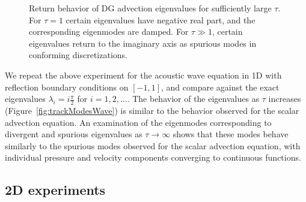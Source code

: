 \documentclass[10pt]{article}
\begin{document}
\begin{figure}
\hspace{.5em}
\hspace{.5em}
\caption{Return behavior of DG advection eigenvalues for sufficiently large $\tau$.  For $\tau = 1$ certain eigenvalues have negative real part, and the corresponding eigenmodes are damped.  For $\tau \gg 1$, certain eigenvalues return to the imaginary axis as spurious modes in conforming discretizations. }
\label{fig:spurious}
\end{figure}

We repeat the above experiment for the acoustic wave equation in 1D with reflection boundary conditions on $[-1,1]$, and compare against the exact eigenvalues $\lambda_i = i \frac{\pi}{2}$ for $i = 1,2,\ldots$.  The behavior of the eigenvalues as $\tau$ increases (Figure~\ref{fig:trackModesWave}) is similar to the behavior observed for the scalar advection equation.  An examination of the eigenmodes corresponding to divergent and spurious eigenvalues as $\tau \rightarrow \infty$ shows that these modes behave similarly to the spurious modes observed for the scalar advection equation, with individual pressure and velocity components converging to continuous functions.    


\subsection{2D experiments}
\end{document}
